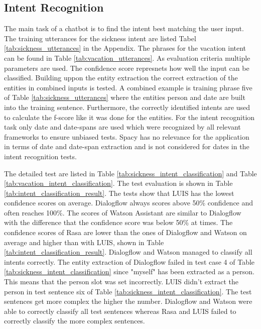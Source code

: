 \subsection*{Intent Recognition}
The main task of a chatbot is to find the intent best matching the user input.
The training utterances for the sickness intent are listed Tabel \ref{tab:sickness_utterances}
in the Appendix.
The phrases for the vacation intent can be found in Table \ref{tab:vacation_utterances}.
As evaluation criteria multiple parameters are used.
The confidence score represnets how well the input can be classified.
Building uppon the entity extraction the correct extraction of the entities in 
combined inputs is tested. 
A combined example is training phrase five of Table \ref{tab:sickness_utterances} 
where the entities person and date are built into the training sentence.
Furthermore, the correctly identified intents are used to calculate the f-score 
like it was done for the entities.
For the intent recognition task only date and date-spans are used which
were recognized by all relevant frameworks to ensure unbiased tests.
Spacy has no relevance for the application in terms of date and date-span
extraction and is not considered for dates in the intent recognition tests.

The detailed test are listed in Table \ref{tab:sickness_intent_classification} and 
Table \ref{tab:vacation_intent_classification}.
The test evaluation is shown in Table \ref{tab:intent_classification_result}.
The tests show that LUIS has the lowest confidence scores on average.
Dialogflow always scores above 50\% confidence and often reaches 100\%.
The scores of Watson Assistant are similar to Dialogflow with the difference 
that the confidence score was below 50\% at times.
The confidence scores of Rasa are lower than the ones of Dialogflow and Watson on 
average and higher than with LUIS, shown in 
Table \ref{tab:intent_classification_result}.
Dialogflow and Watson managed to classify all intents correctly.
The entity extraction of Dialogflow failed in test case 4 of 
Table \ref{tab:sickness_intent_classification} since "myself" has been extracted as a person.
This means that the person slot was set incorrectly.
LUIS didn't extract the person in test sentence six of 
Table \ref{tab:sickness_intent_classification}.
The test sentences get more complex the higher the number.
Dialogflow and Watson were able to correctly classify all test sentences
whereas Rasa and LUIS failed to correctly classify the more complex sentences.

